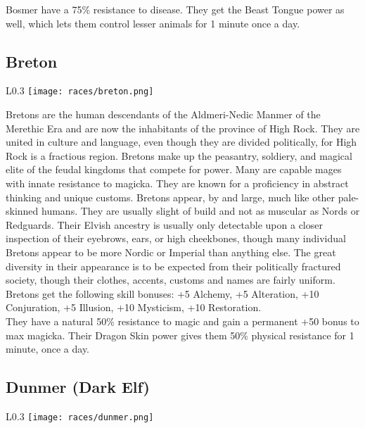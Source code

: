 Bosmer have a 75\% resistance to disease. They get the Beast Tongue power as well, which lets them control lesser animals for 1 minute once a day.

\subsection{Breton}
\begin{wrapfigure}{L}{0.3\textwidth}
	\texttt{[image: races/breton.png]}
\end{wrapfigure}

Bretons are the human descendants of the Aldmeri-Nedic Manmer of the Merethic Era and are now the inhabitants of the province of High Rock. They are united in culture and language, even though they are divided politically, for High Rock is a fractious region. Bretons make up the peasantry, soldiery, and magical elite of the feudal kingdoms that compete for power. Many are capable mages with innate resistance to magicka. They are known for a proficiency in abstract thinking and unique customs. Bretons appear, by and large, much like other pale-skinned humans. They are usually slight of build and not as muscular as Nords or Redguards. Their Elvish ancestry is usually only detectable upon a closer inspection of their eyebrows, ears, or high cheekbones, though many individual Bretons appear to be more Nordic or Imperial than anything else. The great diversity in their appearance is to be expected from their politically fractured society, though their clothes, accents, customs and names are fairly uniform.\\

Bretons get the following skill bonuses: +5 Alchemy, +5 Alteration, +10 Conjuration, +5 Illusion, +10 Mysticism, +10 Restoration.\\

They have a natural 50\% resistance to magic and gain a permanent +50 bonus to max magicka. Their Dragon Skin power gives them 50\% physical resistance for 1 minute, once a day.

\subsection{Dunmer (Dark Elf)}
\begin{wrapfigure}{L}{0.3\textwidth}
	\texttt{[image: races/dunmer.png]}
\end{wrapfigure}

